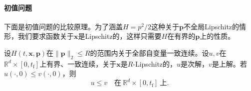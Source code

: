 \paragraph{初值问题}
下面是初值问题的比较原理。为了涵盖$H=p^2/2$这种关于$\bm{p}$不全局Lipschitz的情形，我们要求函数关于$\bm{x}$是Lipschitz的，这样只需要$H$在有界的$\bm{p}$上的性质。

\begin{theorem}[初值问题的比较原理]
\label{thm:hj-comparison}
设$H(t,\bm{x},\bm{p})$在$\lVert\bm{p}\rVert_2\leq R$的范围内关于全部自变量一致连续。设$u,v$在$\mathbb{R}^{d}\times[0,t_{\mathrm{f}}]$上有界、一致连续，关于$\bm{x}$是$R$-Lipschitz的，$u$是次解，$v$是上解。若$u(\cdot,0)\leq v(\cdot,0)$，则
\begin{equation}
  u\leq v\quad\text{在}\ \mathbb{R}^{d}\times[0,t_{\mathrm{f}}]\ \text{上}.
  \label{eq:hj-comparison}
\end{equation}
\end{theorem}

